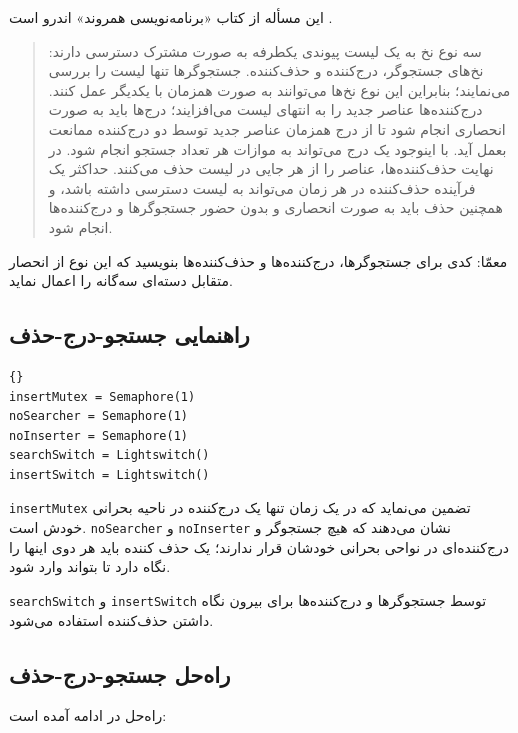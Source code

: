 \documentclass{book}
\newcommand{\clearemptydoublepage}{\newpage\cleardoublepage}
\begin{document}
    این مسأله از کتاب «برنامه‌نویسی همروند» اندرو است \cite{andrews}.

\begin {quotation}
    سه نوع نخ به یک لیست پیوندی یکطرفه به صورت مشترک دسترسی دارند: 
    نخ‌های جستجوگر، درج‌کننده و حذف‌کننده.  جستجوگرها تنها لیست را بررسی می‌نمایند؛ بنابراین این نوع نخ‌ها می‌توانند به صورت همزمان با یکدیگر 
    عمل کنند. درج‌کننده‌ها عناصر جدید را به انتهای لیست می‌افزایند؛ درج‌ها باید به صورت انحصاری انجام شود تا  از درج همزمان عناصر جدید توسط 
    دو درج‌کننده‌ ممانعت بعمل آید. با اینوجود یک درج می‌تواند به موازات هر تعداد جستجو انجام شود. 
    در نهایت حذف‌کننده‌ها، عناصر را از هر جایی در لیست حذف می‌کنند. 
    حداکثر یک فرآینده حذف‌کننده در  هر زمان می‌تواند به لیست دسترسی داشته باشد، و همچنین حذف باید به صورت انحصاری 
    و بدون حضور جستجوگرها و درج‌کننده‌ها انجام شود. 
\end{quotation}

    معمّا: کدی برای جستجوگرها، درج‌کننده‌ها و حذف‌کننده‌ها بنویسید که این نوع از انحصار متقابل دسته‌ای سه‌گانه را اعمال نماید. 


\clearemptydoublepage
\subsection{راهنمایی جستجو-درج-حذف}

\begin{latin}
\begin{lstlisting}[title=\rl{راهنمایی جستجو-درج-حذف}]{}
insertMutex = Semaphore(1)
noSearcher = Semaphore(1)
noInserter = Semaphore(1)
searchSwitch = Lightswitch()    
insertSwitch = Lightswitch()
\end{lstlisting}
\end{latin}

    {\tt insertMutex}
     تضمین می‌نماید که در یک زمان تنها یک درج‌کننده‌ در ناحیه بحرانی خودش است. 
      {\tt noSearcher} و {\tt noInserter} 
    نشان می‌دهند که هیچ جستجوگر و درج‌کننده‌‌ای در نواحی بحرانی خودشان قرار ندارند؛ یک حذف کننده باید هر دوی 
    اینها را نگاه دارد تا بتواند وارد شود. 

{\tt searchSwitch} و {\tt insertSwitch} 
 توسط جستجوگرها و درج‌کننده‌ها برای بیرون نگاه داشتن حذف‌کننده استفاده می‌شود. 


\clearemptydoublepage
\subsection{راه‌حل جستجو-درج-حذف}

    راه‌حل در ادامه آمده است: 
\end{document}
